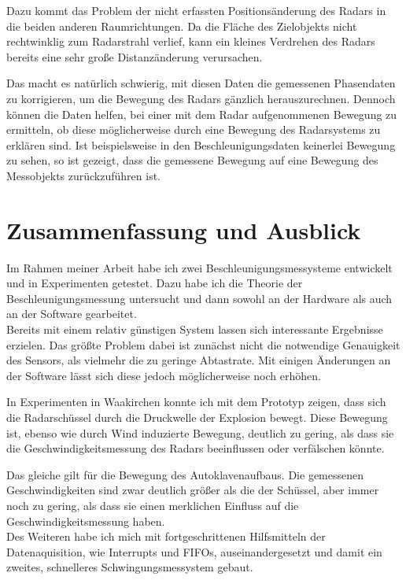 \documentclass[12pt,a4paper,twoside,BCOR=12.5mm]{scrartcl}
\begin{document}
Dazu kommt das Problem der nicht erfassten Positionsänderung des Radars in die beiden anderen Raumrichtungen. Da die Fläche des Zielobjekts nicht rechtwinklig zum Radarstrahl verlief, kann ein kleines Verdrehen des Radars bereits eine sehr große Distanzänderung verursachen.

Das macht es natürlich schwierig, mit diesen Daten die gemessenen Phasendaten zu korrigieren, um die Bewegung des Radars gänzlich herauszurechnen. 
Dennoch können die Daten helfen, bei einer mit dem Radar aufgenommenen Bewegung zu ermitteln, ob diese möglicherweise durch eine Bewegung des Radarsystems zu erklären sind. Ist beispielsweise in den Beschleunigungsdaten keinerlei Bewegung zu sehen, so ist gezeigt, dass die gemessene Bewegung auf eine Bewegung des Messobjekts zurückzuführen ist.

\newpage
\clearpage
\section{Zusammenfassung und Ausblick}

Im Rahmen meiner Arbeit habe ich zwei Beschleunigungsmessysteme entwickelt und in Experimenten getestet. Dazu habe ich die Theorie der Beschleunigungsmessung untersucht und dann sowohl an der Hardware als auch an der Software gearbeitet. \\

Bereits mit einem relativ günstigen System lassen sich interessante Ergebnisse erzielen. Das größte Problem dabei ist zunächst nicht die notwendige Genauigkeit des Sensors, als vielmehr die zu geringe Abtastrate. Mit einigen Änderungen an der Software lässt sich diese jedoch möglicherweise noch erhöhen.

In Experimenten in Waakirchen konnte ich mit dem Prototyp zeigen, dass sich die Radarschüssel durch die Druckwelle der Explosion bewegt. Diese Bewegung ist, ebenso wie durch Wind induzierte Bewegung, deutlich zu gering, als dass sie die Geschwindigkeitsmessung des Radars beeinflussen oder verfälschen könnte. 

Das gleiche gilt für die Bewegung des Autoklavenaufbaus. Die gemessenen Geschwindigkeiten sind zwar deutlich größer als die der Schüssel, aber immer noch zu gering, als dass sie einen merklichen Einfluss auf die Geschwindigkeitsmessung haben.\\


Des Weiteren habe ich mich mit fortgeschrittenen Hilfsmitteln der Datenaquisition, wie Interrupts und FIFOs, auseinandergesetzt und damit ein zweites, schnelleres Schwingungsmessystem gebaut. 
\end{document}
